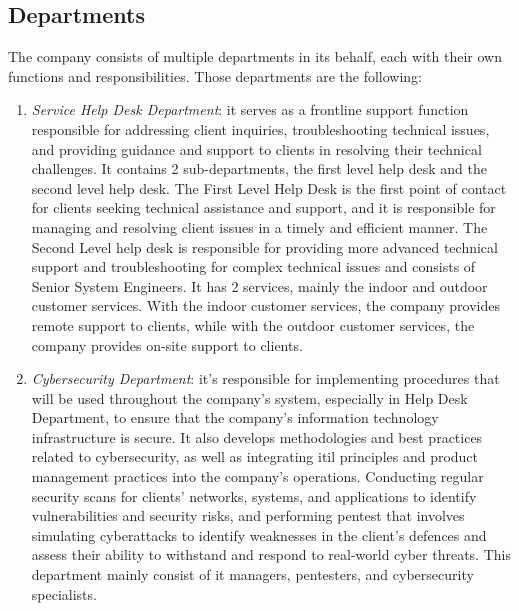 \begin{multicols}{2}
      \subsection{Departments}
      The company consists of multiple departments in its behalf, each with their own functions and responsibilities.
      Those departments are the following:
      \begin{enumerate}
            \item \textit{Service Help Desk Department}: it serves as a frontline support function responsible for
                  addressing client inquiries, troubleshooting technical issues, and providing guidance and support
                  to clients in resolving their technical challenges. It contains 2 sub-departments, the first level
                  help desk and the second level help desk. The First Level Help Desk is the first point of contact
                  for clients seeking technical assistance and support, and it is responsible for managing and
                  resolving client issues in a timely and efficient manner. The Second Level help desk is
                  responsible for providing more advanced technical support and troubleshooting for complex
                  technical issues and consists of Senior System Engineers. It has 2 services, mainly the indoor
                  and outdoor customer services. With the indoor customer services, the company provides remote
                  support to clients, while with the outdoor customer services, the company provides on-site
                  support to clients.
            \item \textit{Cybersecurity Department}: it's responsible for implementing procedures that will be used
                  throughout the company's system, especially in Help Desk Department, to ensure that the company's
                  information technology infrastructure is secure. It also develops methodologies and best practices
                  related to cybersecurity, as well as integrating \acrshort{itil} principles and product management
                  practices into the company's operations. Conducting regular security scans for clients' networks,
                  systems, and applications to identify vulnerabilities and security risks, and performing
                  \gls{pentest} that involves simulating cyberattacks to identify weaknesses in the client's
                  defences and assess their ability to withstand and respond to real-world cyber threats. This
                  department mainly consist of \acrshort{it} managers, pentesters, and cybersecurity specialists.

\end{enumerate}
\end{multicols}
